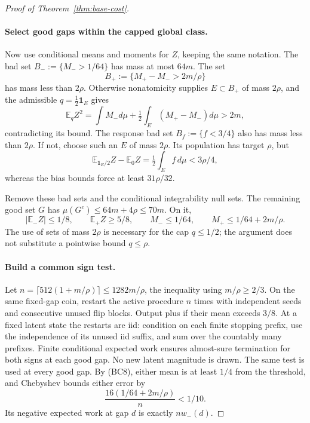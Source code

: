 \begin{proof}[Proof of Theorem~\ref{thm:base-cost}]
\paragraph{Select good gaps within the capped global class.}
Now use conditional means and moments for $Z$, keeping the same notation.
The bad set $B_-:=\{M_->1/64\}$ has mass at most $64m$. The set
\[
                    B_+:=\{M_+-M_->2m/\rho\}
\]
has mass less than $2\rho$. Otherwise nonatomicity supplies
$E\subset B_+$ of mass $2\rho$, and the admissible
$q=\tfrac12\mathbf1_E$ gives
\[
 \mathbb E_qZ^2
 =\int M_-d\mu+\tfrac12\int_E(M_+-M_-)d\mu>2m,
\]
contradicting its bound. The response bad set
$B_f:=\{f<3/4\}$ also has mass less than $2\rho$. If not, choose such
an $E$ of mass $2\rho$. Its population has target $\rho$, but
\[
 \mathbb E_{\mathbf1_E/2}Z-\mathbb E_0Z
       =\tfrac12\int_E f\,d\mu<3\rho/4,
\]
whereas the bias bounds force at least $31\rho/32$.

Remove these bad sets and the conditional integrability null sets. The
remaining good set $G$ has
$\mu(G^c)\le64m+4\rho\le70m$. On it,
\[
 |\mathbb E_-Z|\le1/8,\qquad \mathbb E_+Z\ge5/8,
 \qquad M_-\le1/64,\qquad M_+\le1/64+2m/\rho.           \tag{BC8}
\]
The use of sets of mass $2\rho$ is necessary for the cap $q\le1/2$;
the argument does not substitute a pointwise bound $q\le\rho$.

\paragraph{Build a common sign test.}
Let $n=\lceil512(1+m/\rho)\rceil\le1282m/\rho$, the inequality using
$m/\rho\ge2/3$. On the same fixed-gap coin, restart the active procedure
$n$ times with independent seeds and consecutive unused flip blocks.
Output plus if their mean exceeds $3/8$. At a fixed latent state the
restarts are iid: condition on each finite stopping prefix, use the
independence of its unused iid suffix, and sum over the countably many
prefixes. Finite conditional expected work ensures almost-sure
termination for both signs at each good gap. No new latent magnitude is
drawn. The same test is used at every good gap. By (BC8), either mean is
at least $1/4$ from the threshold, and Chebyshev bounds either error by
\[
                 \frac{16(1/64+2m/\rho)}n<1/10.
\]
Its negative expected work at gap $d$ is exactly $nw_-(d)$.


\end{proof}
